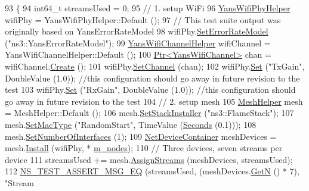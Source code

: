 \begin{DoxyCode}
93 \{
94   int64\_t streamsUsed = 0;
95   \textcolor{comment}{// 1. setup WiFi}
96   \hyperlink{classns3_1_1YansWifiPhyHelper}{YansWifiPhyHelper} wifiPhy = YansWifiPhyHelper::Default ();
97   \textcolor{comment}{// This test suite output was originally based on YansErrorRateModel}
98   wifiPhy.\hyperlink{classns3_1_1WifiPhyHelper_a219d3ae5881842aa42ea341b985ce114}{SetErrorRateModel} (\textcolor{stringliteral}{"ns3::YansErrorRateModel"}); 
99   \hyperlink{classns3_1_1YansWifiChannelHelper}{YansWifiChannelHelper} wifiChannel = YansWifiChannelHelper::Default ();
100   \hyperlink{classns3_1_1Ptr}{Ptr<YansWifiChannel>} chan = wifiChannel.\hyperlink{classns3_1_1YansWifiChannelHelper_a0532e292ab9452f3cf630c848708e563}{Create} ();
101   wifiPhy.\hyperlink{classns3_1_1YansWifiPhyHelper_ad2e9a27587dd4ff320435c93cc2676de}{SetChannel} (chan);
102   wifiPhy.\hyperlink{classns3_1_1WifiPhyHelper_a2527d6d7b29f717fd7436166c5f05f1a}{Set} (\textcolor{stringliteral}{"TxGain"}, DoubleValue (1.0)); \textcolor{comment}{//this configuration should go away in future revision to
       the test}
103   wifiPhy.\hyperlink{classns3_1_1WifiPhyHelper_a2527d6d7b29f717fd7436166c5f05f1a}{Set} (\textcolor{stringliteral}{"RxGain"}, DoubleValue (1.0)); \textcolor{comment}{//this configuration should go away in future revision to
       the test}
104   \textcolor{comment}{// 2. setup mesh}
105   \hyperlink{classns3_1_1MeshHelper}{MeshHelper} mesh = MeshHelper::Default ();
106   mesh.\hyperlink{classns3_1_1MeshHelper_ac1074aff829d0cde1659bdef572880ca}{SetStackInstaller} (\textcolor{stringliteral}{"ns3::FlameStack"});
107   mesh.\hyperlink{classns3_1_1MeshHelper_a549d568927a88e95a721f2be58232c10}{SetMacType} (\textcolor{stringliteral}{"RandomStart"}, TimeValue (\hyperlink{group__timecivil_ga33c34b816f8ff6628e33d5c8e9713b9e}{Seconds} (0.1)));
108   mesh.\hyperlink{classns3_1_1MeshHelper_adfc08b62a8d6e835d0fbbac7a349ef5f}{SetNumberOfInterfaces} (1);
109   \hyperlink{classns3_1_1NetDeviceContainer}{NetDeviceContainer} meshDevices = mesh.\hyperlink{classns3_1_1MeshHelper_a7b33f6ca7b6842b3def4479bc7526f2c}{Install} (wifiPhy, *
      \hyperlink{classFlameRegressionTest_a86bffb878b688af7c76815e44edc8f1a}{m\_nodes});
110   \textcolor{comment}{// Three devices, seven streams per device}
111   streamsUsed += mesh.\hyperlink{classns3_1_1MeshHelper_a93e9c88a375a86c621a494aafe68882e}{AssignStreams} (meshDevices, streamsUsed);
112   \hyperlink{group__testing_ga2a9d78cffb3db8e867c35fff0b698cf5}{NS\_TEST\_ASSERT\_MSG\_EQ} (streamsUsed, (meshDevices.\hyperlink{classns3_1_1NetDeviceContainer_a74cafc212479bc38976bebd118e856b9}{GetN} () * 7), \textcolor{stringliteral}{"Stream
}
\end{DoxyCode}
